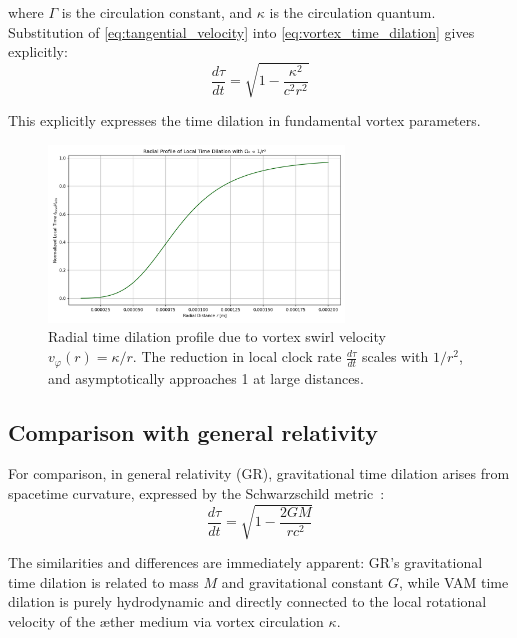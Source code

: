 where $\Gamma$ is the circulation constant, and $\kappa$ is the circulation quantum. Substitution of \eqref{eq:tangential_velocity} into \eqref{eq:vortex_time_dilation} gives explicitly:
\begin{equation}\label{eq:vortex_time_explicit}
\frac{d\tau}{dt} = \sqrt{1 - \frac{\kappa^2}{c^2 r^2}}
\end{equation}

This explicitly expresses the time dilation in fundamental vortex parameters.

\begin{figure}[H]
  \centering
  \includegraphics[width=0.7\textwidth]{images/02-RadialProfileOfLocalTimeDilation_Radial_LocalTime_Dilation}
  \caption{Radial time dilation profile due to vortex swirl velocity \( v_\varphi(r) = \kappa / r \). The reduction in local clock rate \(\frac{d\tau}{dt}\) scales with \(1/r^2\), and asymptotically approaches 1 at large distances.}
  \label{fig:radial_time_dilation}
\end{figure}

\subsection{Comparison with general relativity}

For comparison, in general relativity (GR), gravitational time dilation arises from spacetime curvature, expressed by the Schwarzschild metric~\cite{schutz2009first}:
\begin{equation}\label{eq:GRtime}
\frac{d\tau}{dt} = \sqrt{1 - \frac{2GM}{rc^2}}
\end{equation}

The similarities and differences are immediately apparent: GR's gravitational time dilation is related to mass $M$ and gravitational constant $G$, while VAM time dilation is purely hydrodynamic and directly connected to the local rotational velocity of the æther medium via vortex circulation $\kappa$.

